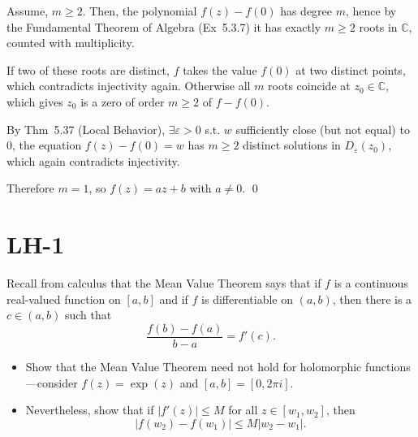 \documentclass[a4paper]{article}
\begin{document}
Assume, $m \geq 2$. Then, the polynomial $f(z) - f(0)$ has degree $m$, hence by the Fundamental Theorem of Algebra (Ex~5.3.7) it has exactly $m \geq 2$ roots in $\mathbb{C}$, counted with multiplicity. 

If two of these roots are distinct, $f$ takes the value $f(0)$ at two distinct points, which contradicts injectivity again. Otherwise all $m$ roots coincide at $z_0 \in \mathbb{C}$, which gives $z_0$ is a zero of order $m \geq 2$ of $f - f(0)$. 

\medskip
By Thm~5.37 (Local Behavior), $\exists\varepsilon > 0$ s.t. $w$ sufficiently close (but not equal) to $0$, the equation $f(z) - f(0) = w$ has $m \geq 2$ distinct solutions in $D_\varepsilon(z_0)$, which again contradicts injectivity.

\medskip
Therefore $m = 1$, so $f(z) = a z + b$ with $a \neq 0$. \qed

\newpage
\section*{LH-1}

\begin{tcolorbox}[colback=gray!10, colframe=black, boxrule=0.5pt, arc=2mm]
Recall from calculus that the Mean Value Theorem says that if $f$ is a continuous real-valued function on $[a,b]$ and if $f$ is differentiable on $(a,b)$, then there is a $c \in (a,b)$ such that
\[
\frac{f(b) - f(a)}{b - a} = f'(c).
\]
\begin{itemize}
\item[\textbf{(a)}] Show that the Mean Value Theorem need not hold for holomorphic functions---consider $f(z) = \exp(z)$ and $[a,b] = [0, 2\pi i]$.
\item[\textbf{(b)}] Nevertheless, show that if $|f'(z)| \leq M$ for all $z \in [w_1, w_2]$, then
\[
|f(w_2) - f(w_1)| \leq M |w_2 - w_1|.
\]
\end{itemize}
\end{tcolorbox}
\end{document}
